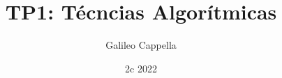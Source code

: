 \documentclass[12pt]{article}
\begin{document}
\title{TP1: Técncias Algorítmicas}
\author{Galileo Cappella}
\date{2c 2022}


\maketitle
\tableofcontents

\pagebreak


\end{document}
